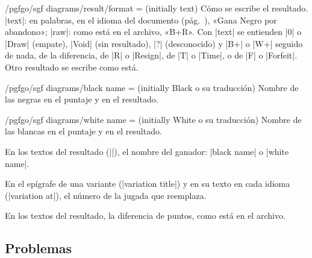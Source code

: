 \begin{key}{/pgfgo/sgf diagrams/result/format =  (initially text)}
	Cómo se escribe el resultado. |text|: en palabras, en el idioma del documento (pág.~\pageref{subsec:idiomas}), «Gana Negro por abandono»; |raw|: como está en el archivo, «B+R». Con |text| se entienden |0| o |Draw| (empate), |Void| (sin resultado), |?| (desconocido) y |B+| o |W+| seguido de nada, de la diferencia, de |R| o |Resign|, de |T| o |Time|, o de |F| o |Forfeit|. Otro resultado se escribe como está.
\end{key}

\begin{key}{/pgfgo/sgf diagrams/black name =  (initially Black o su traducción)}
	Nombre de las negras en el puntaje y en el resultado.
\end{key}

\begin{key}{/pgfgo/sgf diagrams/white name =  (initially White o su traducción)}
	Nombre de las blancas en el puntaje y en el resultado.

	\begin{codeexample}
	\end{codeexample}

\end{key}

\begin{command}{\pgfgowinner}
	En los textos del resultado (|\pgfgodefinelanguage|), el nombre del ganador: |black name| o |white name|.
\end{command}

\begin{command}{\pgfgovariationmove}
	En el epígrafe de una variante (|variation title|) y en su texto en cada idioma (|variation at|), el número de la jugada que reemplaza.
\end{command}

\begin{command}{\pgfgopoints}
	En los textos del resultado, la diferencia de puntos, como está en el archivo.
\end{command}

\subsection{Problemas}
\label{subsec:sgfproblemas}

